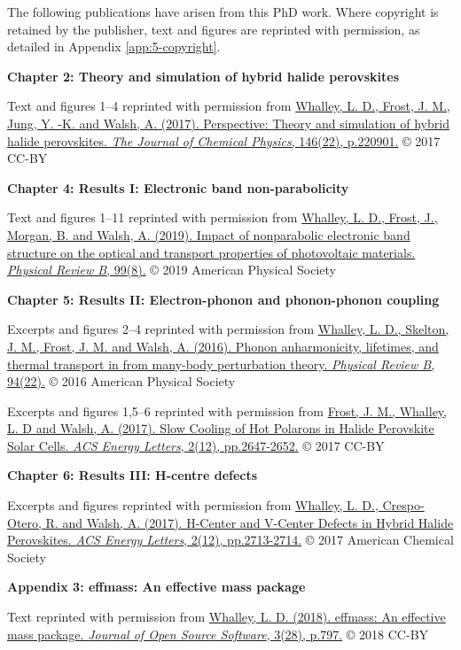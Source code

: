 
The following publications have arisen from this PhD work. Where copyright is retained by the publisher, text and figures are reprinted with permission, as detailed in Appendix \ref{app:5-copyright}.

\vspace{\frontmatterbaselineskip}

\textbf{Chapter 2: Theory and simulation of hybrid halide perovskites } 

Text and figures 1--4 reprinted with permission from
\href{https://doi.org/10.1063/1.4984964}{Whalley, L. D., Frost, J. M., Jung, Y. -K. and Walsh, A. (2017). Perspective: Theory and simulation of hybrid halide perovskites. \textit{The Journal of Chemical Physics}, 146(22), p.220901.} © 2017 CC-BY
\vspace{\frontmatterbaselineskip}

\textbf{Chapter 4: Results I: Electronic band non-parabolicity}

Text and figures 1--11 reprinted with permission from
\href{https://doi.org/10.1103/PhysRevB.99.085207}{Whalley, L. D., Frost, J., Morgan, B. and Walsh, A. (2019). Impact of nonparabolic electronic band structure on the optical and transport properties of photovoltaic materials. \textit{Physical Review B}, 99(8).} © 2019 American Physical Society
\vspace{\frontmatterbaselineskip}

\textbf{Chapter 5: Results II: Electron-phonon and phonon-phonon coupling}

Excerpts and figures 2--4 reprinted with permission from
\href{https://doi.org/10.1103/PhysRevB.94.220301}{Whalley, L. D., Skelton, J. M., Frost, J. M. and Walsh, A. (2016). Phonon anharmonicity, lifetimes, and thermal transport in  from many-body perturbation theory. \textit{Physical Review B}, 94(22).} © 2016 American Physical Society

Excerpts and figures 1,5--6 reprinted with permission from
\href{https://doi.org/10.1021/acsenergylett.7b00862}{Frost, J. M., Whalley, L. D and Walsh, A. (2017). Slow Cooling of Hot Polarons in Halide Perovskite Solar Cells. \textit{ACS Energy Letters}, 2(12), pp.2647-2652.} © 2017 CC-BY
\vspace{\frontmatterbaselineskip}

\textbf{Chapter 6: Results III: H-centre defects}

Excerpts and figures reprinted with permission from
\href{https://doi.org/10.1021/acsenergylett.7b00995}{Whalley, L. D., Crespo-Otero, R. and Walsh, A. (2017). H-Center and V-Center Defects in Hybrid Halide Perovskites. \textit{ACS Energy Letters}, 2(12), pp.2713-2714.} © 2017 American Chemical Society 
\vspace{\frontmatterbaselineskip}

\textbf{Appendix 3: effmass: An effective mass package}

Text reprinted with permission from
\href{https://doi.org/10.21105/joss.00797}{Whalley, L. D. (2018). effmass: An effective mass package. \textit{Journal of Open Source Software}, 3(28), p.797.} © 2018 CC-BY 



